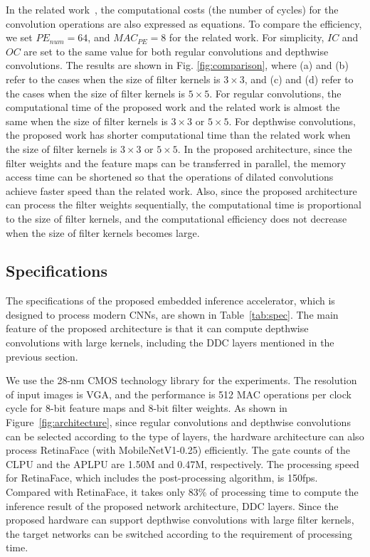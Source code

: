 \documentclass[runningheads]{llncs}
\begin{document}
In the related work~\cite{Yu20}, the computational costs (the number of cycles) for the convolution operations are also expressed as equations. To compare the efficiency, we set $PE_{num} = 64$, and $MAC_{PE} = 8$ for the related work. For simplicity, $IC$ and $OC$ are set to the same value for both regular convolutions and depthwise convolutions. The results are shown in Fig. \ref{fig:comparison}, where (a) and (b) refer to the cases when the size of filter kernels is $3 \times 3$, and (c) and (d) refer to the cases when the size of filter kernels is $5 \times 5$. For regular convolutions, the computational time of the proposed work and the related work is almost the same when the size of filter kernels is $3 \times 3$ or $5 \times 5$. For depthwise convolutions, the proposed work has shorter computational time than the related work when the size of filter kernels is $3 \times 3$ or $5 \times 5$. In the proposed architecture, since the filter weights and the feature maps can be transferred in parallel, the memory access time can be shortened so that the operations of dilated convolutions achieve faster speed than the related work. Also, since the proposed architecture can process the filter weights sequentially, the computational time is proportional to the size of filter kernels, and the computational efficiency does not decrease when the size of filter kernels becomes large.

\subsection{Specifications}
\label{subsec:specs}

The specifications of the proposed embedded inference accelerator, which is designed to process modern CNNs, are shown in Table~\ref{tab:spec}. The main feature of the proposed architecture is that it can compute depthwise convolutions with large kernels, including the DDC layers mentioned in the previous section.

We use the 28-nm CMOS technology library for the experiments. The resolution of input images is VGA, and the performance is 512 MAC operations per clock cycle for 8-bit feature maps and 8-bit filter weights. As shown in Figure~\ref{fig:architecture}, since regular convolutions and depthwise convolutions can be selected according to the type of layers, the hardware architecture can also process RetinaFace (with MobileNetV1-0.25) efficiently. The gate counts of the CLPU and the APLPU are 1.50M and 0.47M, respectively. The processing speed for RetinaFace, which includes the post-processing algorithm, is 150fps. Compared with RetinaFace, it takes only 83\% of processing time to compute the inference result of the proposed network architecture, DDC layers. Since the proposed hardware can support depthwise convolutions with large filter kernels, the target networks can be switched according to the requirement of processing time.
\end{document}
